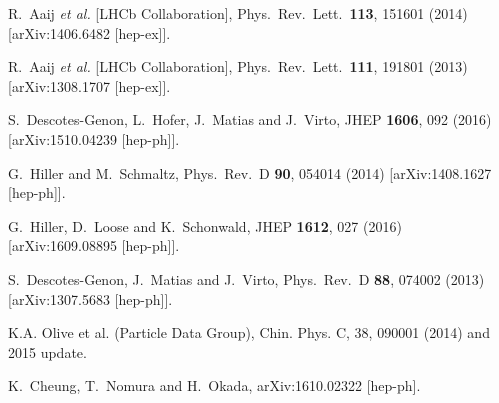 \documentclass[%
showkeys,12pt,
preprint,preprintnumbers,nofootinbib,
groupedaddress,superscriptaddress,amsmath,amssymb]{revtex4}
\numberwithin{equation}{section}
\begin{document}
\begin{thebibliography}{99}

R.~Aaij {\it et al.} [LHCb Collaboration],
  Phys.\ Rev.\ Lett.\  {\bf 113}, 151601 (2014)
  [arXiv:1406.6482 [hep-ex]].

  R.~Aaij {\it et al.} [LHCb Collaboration],
  Phys.\ Rev.\ Lett.\  {\bf 111}, 191801 (2013)
  [arXiv:1308.1707 [hep-ex]].


  S.~Descotes-Genon, L.~Hofer, J.~Matias and J.~Virto,
  JHEP {\bf 1606}, 092 (2016)
  [arXiv:1510.04239 [hep-ph]].


  G.~Hiller and M.~Schmaltz,
  Phys.\ Rev.\ D {\bf 90}, 054014 (2014)
  [arXiv:1408.1627 [hep-ph]].
  
  G.~Hiller, D.~Loose and K.~Schonwald,
  JHEP {\bf 1612}, 027 (2016)
  [arXiv:1609.08895 [hep-ph]].
  
  S.~Descotes-Genon, J.~Matias and J.~Virto,
  Phys.\ Rev.\ D {\bf 88}, 074002 (2013)
  [arXiv:1307.5683 [hep-ph]].
  
K.A. Olive et al. (Particle Data Group), Chin. Phys. C, 38, 090001 (2014) 
and 2015 update.


  K.~Cheung, T.~Nomura and H.~Okada,
  arXiv:1610.02322 [hep-ph].
  

\end{thebibliography}
\end{document}
